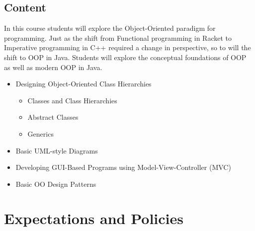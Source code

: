 \documentclass[10pt]{article}
\begin{document}
\subsection{Content}

In this course students will explore the Object-Oriented paradigm for programming. Just as the shift from Functional programming in Racket to Imperative programming in C++ required a change in perspective, so to will the shift to OOP in Java.  Students will explore the conceptual foundations of OOP as well as modern OOP in Java.

\begin{itemize}
\item Designing Object-Oriented Class Hierarchies
\begin{itemize}
\item Classes and Class Hierarchies
\item Abstract Classes
\item Generics
\end{itemize}
\item Basic UML-style Diagrams
\item Developing GUI-Based Programs using Model-View-Controller (MVC)
\item Basic OO Design Patterns
\end{itemize}


\section{Expectations and Policies}
\end{document}
